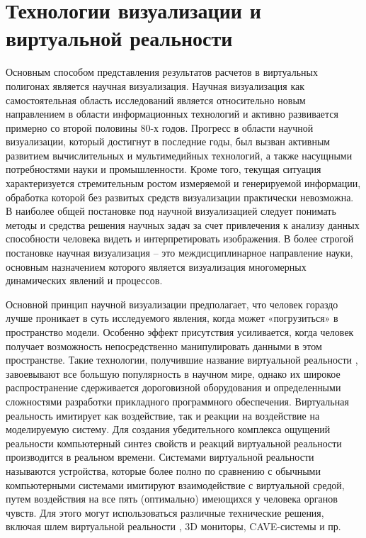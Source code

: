 \section{Технологии визуализации и виртуальной реальности }

Основным способом представления результатов расчетов в виртуальных полигонах является научная визуализация.
Научная визуализация как самостоятельная область исследований является относительно новым направлением в области информационных технологий и активно развивается примерно со второй половины 80-х годов. Прогресс в области научной визуализации, который достигнут в последние годы, был вызван активным развитием вычислительных и мультимедийных технологий, а также насущными потребностями науки и промышленности. Кроме того, текущая ситуация характеризуется стремительным ростом измеряемой и генерируемой информации, обработка которой без развитых средств визуализации практически невозможна. В наиболее общей постановке под научной визуализацией следует понимать методы и средства решения научных задач за счет привлечения к анализу данных способности человека видеть и интерпретировать изображения. В более строгой постановке научная визуализация – это междисциплинарное направление науки, основным назначением которого является визуализация многомерных динамических явлений и процессов.

Основной принцип научной визуализации предполагает, что человек гораздо лучше проникает в суть исследуемого явления, когда может «погрузиться» в пространство модели. Особенно эффект присутствия усиливается, когда человек получает возможность непосредственно манипулировать данными в этом пространстве. Такие технологии, получившие название виртуальной реальности \citep{dk51}\citep{dk52}, завоевывают все большую популярность в научном мире, однако их широкое распространение сдерживается дороговизной оборудования и определенными сложностями разработки прикладного программного обеспечения. Виртуальная реальность имитирует как воздействие, так и реакции на воздействие на моделируемую систему. Для создания убедительного комплекса ощущений реальности компьютерный синтез свойств и реакций виртуальной реальности производится в реальном времени. Системами виртуальной реальности называются устройства, которые более полно по сравнению с обычными компьютерными системами имитируют взаимодействие с виртуальной средой, путем воздействия на все пять (оптимально) имеющихся у человека органов чувств. Для этого могут использоваться различные технические решения, включая шлем виртуальной реальности \citep{dk53}, 3D мониторы, CAVE-системы \citep{dk54} и пр.

